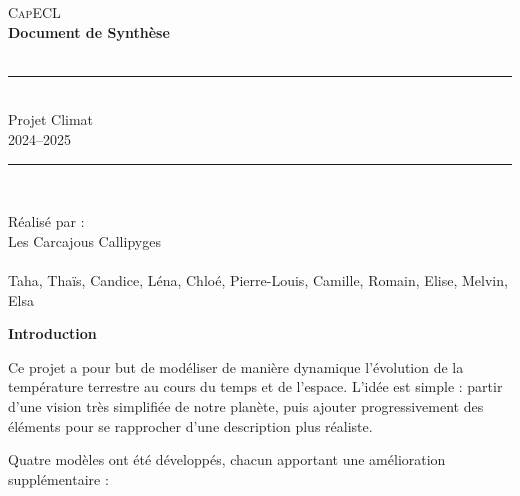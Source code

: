 \documentclass[a4paper,12pt]{article}
\begin{document}
\begin{titlepage}
    \centering

    \vspace*{2cm}
    
    {\LARGE \textsc{CapECL}}\\[1.5cm] %
    
    {\Huge \bfseries Document de Synthèse}\\[0.5cm]
    {\Large \itshape}\\[2cm] %

    \rule{\textwidth}{0.4pt}\\[0.4cm]
    {\large Projet Climat}\\[0.2cm]
    {\large  2024–2025}\\
    \rule{\textwidth}{0.4pt}\\[2cm]
    
    \vfill
    
    {\large Réalisé par :}\\
    {\large  Les Carcajous Callipyges}\\[0.5cm]

    {\large }\\
    {\large Taha, Thaïs, Candice, Léna, Chloé, Pierre-Louis, Camille, Romain, Elise, Melvin, Elsa}\\[1cm]

    \vfill

\end{titlepage}

\tableofcontents
\newpage
{}
{\LARGE \textbf{Introduction\\}}


Ce projet a pour but de modéliser de manière dynamique l'évolution de la température terrestre au cours du temps et de l'espace. L'idée est simple : partir d’une vision très simplifiée de notre planète, puis ajouter progressivement des éléments pour se rapprocher d’une description plus réaliste.

Quatre modèles ont été développés, chacun apportant une amélioration supplémentaire : 
\end{document}
